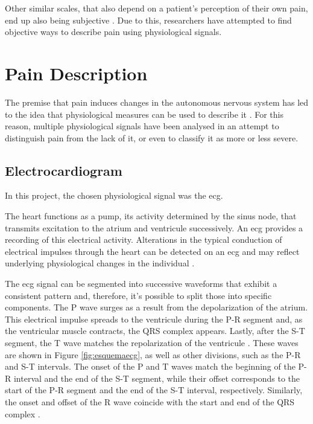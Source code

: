 Other similar scales, that also depend on a patient's perception of their own pain, end up also being subjective \cite{Adeboye2021}\cite{Robinson2024}. Due to this, researchers have attempted to find objective ways to describe pain using physiological signals.


\section{Pain Description}

The premise that pain induces changes in the autonomous nervous system has led to the idea that physiological measures can be used to describe it \cite{Rojas2023}. For this reason, multiple physiological signals have been analysed in an attempt to distinguish pain from the lack of it, or even to classify it as more or less severe. 






\subsection{Electrocardiogram}

In this project, the chosen physiological signal was the \ac{ecg}.

The heart functions as a pump, its activity determined by the sinus node, that transmits excitation to the atrium and ventricule successively. An \ac{ecg} provides a recording of this electrical activity. Alterations in the typical conduction of electrical impulses through the heart can be detected on an \ac{ecg} and may reflect underlying physiological changes in the individual \cite{Liu2022}.

The \ac{ecg} signal can be segmented into successive waveforms that exhibit a consistent pattern and, therefore, it's possible to split those into specific components. The P wave surges as a result from the depolarization of the atrium. This electrical impulse spreads to the ventricule during the P-R segment and, as the ventricular muscle contracts, the QRS complex appears. Lastly, after the S-T segment, the T wave matches the repolarization of the ventricule \cite{hampton2024ecg}. These waves are shown in Figure \ref{fig:esquemaecg}, as well as other divisions, such as the P-R and S-T intervals. The onset of the P and T waves match the beginning of the P-R interval and the end of the S-T segment, while their offset corresponds to the start of the P-R segment and the end of the S-T interval, respectively. Similarly, the onset and offset of the R wave coincide with the start and end of the QRS complex \cite{Zhang2024}.

